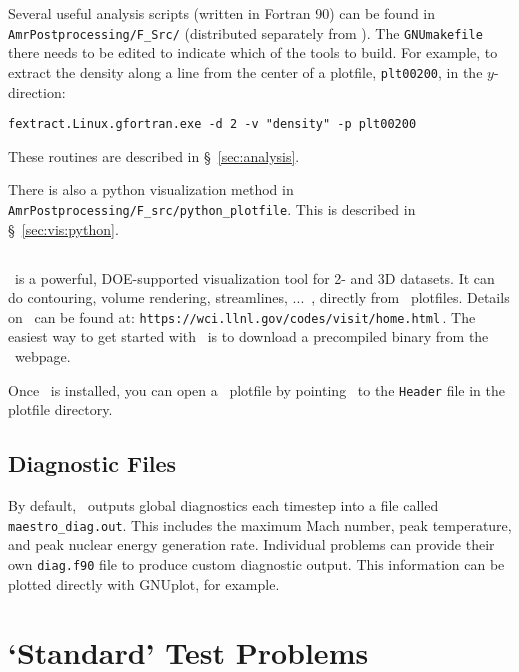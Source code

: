 Several useful analysis scripts (written in Fortran 90) can be found
in {\tt AmrPostprocessing/F\_Src/} (distributed separately
from \maestro).  The {\tt GNUmakefile} there needs to be edited to
indicate which of the tools to build.  For example, to extract the
density along a line from the center of a plotfile, {\tt plt00200}, in
the $y$-direction:

\begin{verbatim}
fextract.Linux.gfortran.exe -d 2 -v "density" -p plt00200
\end{verbatim}

These routines are described in \S~\ref{sec:analysis}.

There is also a python visualization method in {\tt
AmrPostprocessing/F\_src/python\_plotfile}.  This is described
in \S~\ref{sec:vis:python}.


\subsection{\visit}

\visit\ is a powerful, DOE-supported visualization tool for 2- and 3D
datasets.  It can do contouring, volume rendering, streamlines, ...\, ,
directly from \boxlib\ plotfiles.   Details on
\visit\ can be found at:\newline
 {\tt https://wci.llnl.gov/codes/visit/home.html}\,. \newline
The easiest way to get started with \visit\ is to download a precompiled
binary from the \visit\ webpage.

Once \visit\ is installed, you can open a \boxlib\ plotfile by pointing
\visit\ to the {\tt Header} file in the plotfile directory.

\subsection{Diagnostic Files}

By default, \maestro\ outputs global diagnostics each timestep into a
file called {\tt maestro\_diag.out}.  This includes the maximum Mach
number, peak temperature, and peak nuclear energy generation rate.
Individual problems can provide their own {\tt diag.f90} file to
produce custom diagnostic output.  This information can be plotted
directly with {\sf GNUplot}, for example.





\section{`Standard' Test Problems}

